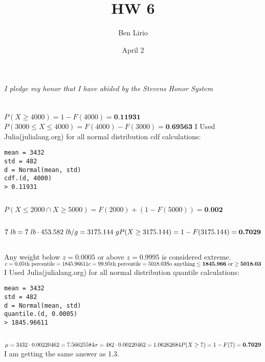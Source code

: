 \documentclass[12pt, letterpaper]{article}
\title{HW 6}
\author{Ben Lirio}
\date{April 2}
\begin{document}
\maketitle
\textit{I pledge my honor that I have abided by the Stevens Honor System}
\newpage

\section{}
\subsection{}
$P(X \ge 4000) = 1 - F(4000) = \textbf{0.11931}$
\newline
$P(3000 \le X \le 4000) = F(4000) - F(3000) = \textbf{0.69563}$
\newline
I Used Julia(julialang.org) for all normal distribution cdf calculations:
\begin{verbatim}
mean = 3432
std = 482
d = Normal(mean, std)
cdf.(d, 4000)
> 0.11931
\end{verbatim}
\subsection{}
$P(X \le 2000 \cap X \ge 5000) = F(2000) + (1 - F(5000)) = \textbf{0.002}$
\subsection{}
\(
7\ lb = 7\ lb\cdot 453.582\ lb/g = 3175.144\ g \\
P(X \ge 3175.144) = 1 - F(3175.144) = \textbf{0.7029} \\
\)
\subsection{}
Any weight below $z = 0.0005$ or above $z = 0.9995$ is considered extreme.
\newline
\(
c = \textrm{0.05th percentile} = 1845.96611 \\
c = \textrm{99.95th percentile} = 5018.03 \\
\textrm{So anything} \le \textbf{1845.966} \ \textrm{or} \ge \textbf{5018.03} \\
\)
I Used Julia(julialang.org) for all normal distribution quantile calculations:
\begin{verbatim}
mean = 3432
std = 482
d = Normal(mean, std)
quantile.(d, 0.0005)
> 1845.96611
\end{verbatim}
\subsection{}
\(
\mu = 3432 \cdot 0.00220462 = 7.56625584 \\
\sigma = 482 \cdot 0.00220462 = 1.06262684 \\
P(X \ge 7) = 1 - F(7) = \textbf{0.7029} \\
\)
I am getting the same answer as 1.3.
\end{document}
